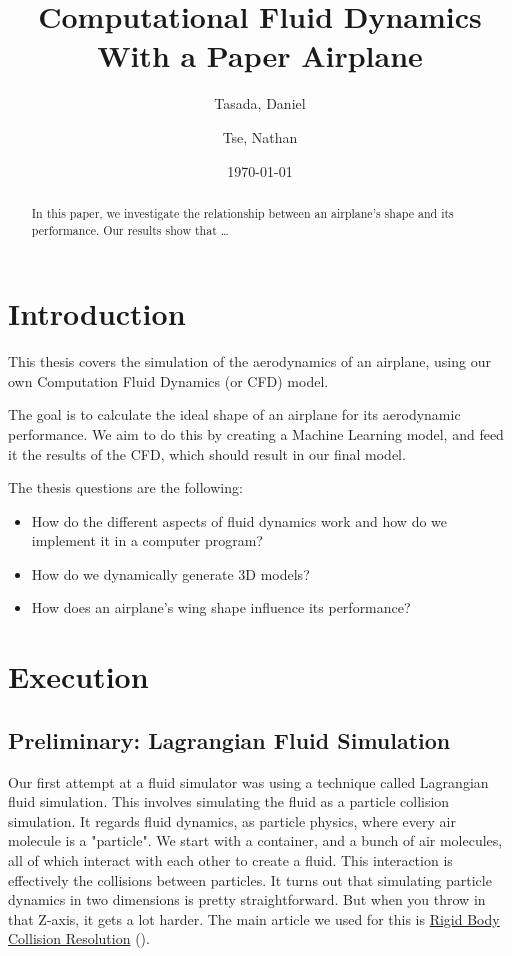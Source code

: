 \documentclass[a4paper,12pt]{article}
\title{Computational Fluid Dynamics With a Paper Airplane}
\author{
  Tasada, Daniel\\
  \and
  Tse, Nathan\\
}
\date{\today}
\begin{document}
\maketitle
\begin{abstract}
	In this paper, we investigate the relationship between an airplane's shape
	and its performance. Our results show that \dots
\end{abstract}

\tableofcontents

\section{Introduction}
This thesis covers the simulation of the aerodynamics of an airplane, using
our own Computation Fluid Dynamics (or CFD) model.

The goal is to calculate the ideal shape of an airplane for its aerodynamic
performance. We aim to do this by creating a Machine Learning model, and feed
it the results of the CFD, which should result in our final model.

The thesis questions are the following:
\begin{itemize}
	\item{How do the different aspects of fluid dynamics work and how do we
		implement it in a computer program?}
	\item{How do we dynamically generate 3D models?}
	\item{How does an airplane's wing shape influence its performance?}
\end{itemize}

\section{Execution}
\subsection{Preliminary: Lagrangian Fluid Simulation}
Our first attempt at a fluid simulator was using a technique called Lagrangian
fluid simulation. This involves simulating the fluid as a particle collision
simulation. It regards fluid dynamics, as particle physics, where every air
molecule is a "particle". We start with a container, and a bunch of air molecules,
all of which interact with each other to create a fluid. This interaction is
effectively the collisions between particles. It turns out that simulating
particle dynamics in two dimensions is pretty straightforward. But when you
throw in that Z-axis, it gets a lot harder. The main article we used for this is
\hyperlink{http://www.hakenberg.de/diffgeo/collision_resolution.htm}{Rigid Body Collision Resolution} (\cite{hakenberg}).
\end{document}
